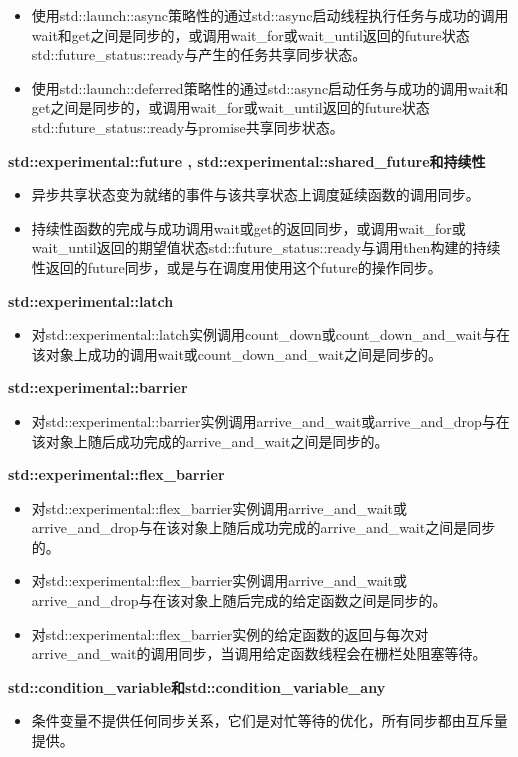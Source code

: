 \begin{itemize}
    \item 使用std::launch::async策略性的通过std::async启动线程执行任务与成功的调用wait和get之间是同步的，或调用wait\_for或wait\_until返回的future状态std::future\_status::ready与产生的任务共享同步状态。
    \item 使用std::launch::deferred策略性的通过std::async启动任务与成功的调用wait和get之间是同步的，或调用wait\_for或wait\_until返回的future状态std::future\_status::ready与promise共享同步状态。
\end{itemize}

\textbf{std::experimental::future ,  std::experimental::shared\_future和持续性}

\begin{itemize}
    \item 异步共享状态变为就绪的事件与该共享状态上调度延续函数的调用同步。
    \item 持续性函数的完成与成功调用wait或get的返回同步，或调用wait\_for或wait\_until返回的期望值状态std::future\_status::ready与调用then构建的持续性返回的future同步，或是与在调度用使用这个future的操作同步。
\end{itemize}

\textbf{std::experimental::latch}

\begin{itemize}
    \item 对std::experimental::latch实例调用count\_down或count\_down\_and\_wait与在该对象上成功的调用wait或count\_down\_and\_wait之间是同步的。
\end{itemize}

\textbf{std::experimental::barrier}

\begin{itemize}
    \item 对std::experimental::barrier实例调用arrive\_and\_wait或arrive\_and\_drop与在该对象上随后成功完成的arrive\_and\_wait之间是同步的。
\end{itemize}

\textbf{std::experimental::flex\_barrier}

\begin{itemize}
    \item 对std::experimental::flex\_barrier实例调用arrive\_and\_wait或arrive\_and\_drop与在该对象上随后成功完成的arrive\_and\_wait之间是同步的。
    \item 对std::experimental::flex\_barrier实例调用arrive\_and\_wait或arrive\_and\_drop与在该对象上随后完成的给定函数之间是同步的。
    \item 对std::experimental::flex\_barrier实例的给定函数的返回与每次对arrive\_and\_wait的调用同步，当调用给定函数线程会在栅栏处阻塞等待。
\end{itemize}

\textbf{std::condition\_variable和std::condition\_variable\_any}

\begin{itemize}
    \item 条件变量不提供任何同步关系，它们是对忙等待的优化，所有同步都由互斥量提供。
\end{itemize}
